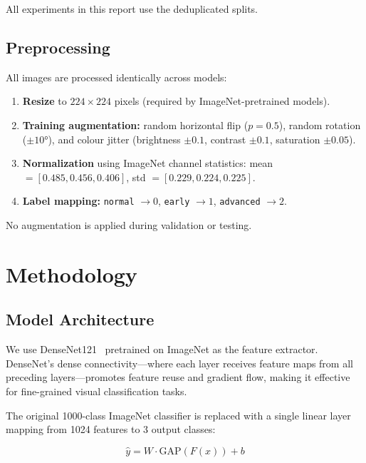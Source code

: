 \documentclass[conference]{IEEEtran}
\begin{document}
All experiments in this report use the deduplicated splits.

\subsection{Preprocessing}

All images are processed identically across models:

\begin{enumerate}
    \item \textbf{Resize} to $224 \times 224$ pixels (required by ImageNet-pretrained models).
    \item \textbf{Training augmentation:} random horizontal flip ($p=0.5$), random rotation ($\pm 10°$), and colour jitter (brightness $\pm 0.1$, contrast $\pm 0.1$, saturation $\pm 0.05$).
    \item \textbf{Normalization} using ImageNet channel statistics: mean $= [0.485, 0.456, 0.406]$, std $= [0.229, 0.224, 0.225]$.
    \item \textbf{Label mapping:} \texttt{normal} $\rightarrow 0$, \texttt{early} $\rightarrow 1$, \texttt{advanced} $\rightarrow 2$.
\end{enumerate}

No augmentation is applied during validation or testing.

\section{Methodology}
\label{sec:method}

\subsection{Model Architecture}

We use DenseNet121~\cite{huang2017densely} pretrained on ImageNet as the feature extractor.
DenseNet's dense connectivity---where each layer receives feature maps from all preceding layers---promotes feature reuse and gradient flow, making it effective for fine-grained visual classification tasks.

The original 1000-class ImageNet classifier is replaced with a single linear layer mapping from 1024 features to 3 output classes:

\begin{equation}
    \hat{y} = W \cdot \text{GAP}(F(x)) + b
\end{equation}
\end{document}

